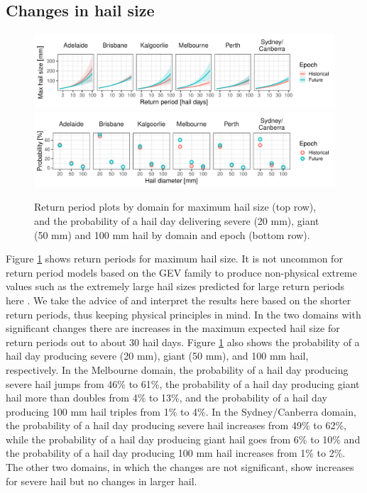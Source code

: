 \documentclass[]{agujournal2019}\usepackage[]{graphicx}\usepackage[]{xcolor}
\begin{document}
\subsection{Changes in hail size}

\begin{figure}[!ht]
      \includegraphics[width=\textwidth]{figures/return_periods_hail}
      \includegraphics[width=\textwidth]{figures/hail_probs}
      \caption{Return period plots by domain for maximum hail size (top row), and the probability of a hail day delivering severe (20 mm), giant (50 mm) and 100 mm hail by domain and epoch (bottom row).}
      \label{fig:return_periods_probs_hail}
\end{figure}







Figure \ref{fig:return_periods_probs_hail} shows return periods for maximum hail size. It is not uncommon for return period models based on the GEV family to produce non-physical extreme values such as the extremely large hail sizes predicted for large return periods here \cite[p. 66]{Coles_2001}. We take the advice of  and interpret the results here based on the shorter return periods, thus keeping physical principles in mind. In the two domains with significant changes there are increases in the maximum expected hail size for return periods out to about 30 hail days. Figure \ref{fig:return_periods_probs_hail} also shows the probability of a hail day producing severe (20 mm), giant (50 mm), and 100 mm hail, respectively. In the Melbourne domain, the probability of a hail day producing severe hail jumps from 46\% to 61\%, the probability of a hail day producing giant hail more than doubles from 4\% to 13\%, and the probability of a hail day producing 100 mm hail triples from 1\% to 4\%. In the Sydney/Canberra domain, the probability of a hail day producing severe hail increases from 49\% to 62\%, while the probability of a hail day producing giant hail goes from 6\% to 10\% and the probability of a hail day producing 100 mm hail increases from 1\% to 2\%. The other two domains, in which the changes are not significant, show increases for severe hail but no changes in larger hail.
\end{document}
